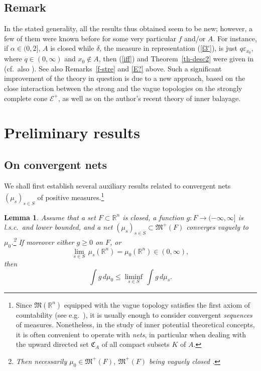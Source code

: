 \documentclass[12pt,a4paper,reqno]{amsart} %
\theoremstyle{lause}
\theoremstyle{maaritelma}
\theoremstyle{lause}
\newtheorem{lemma}[theorem]{Lemma}
\theoremstyle{maaritelma}
\numberwithin{equation}{section}
\begin{document}
\subsection{Remark}\label{sec-remark}
  In the stated generality,
  all the results thus obtained seem to be new; however, a few of them were known before for some very particular $f$ and/or $A$. For instance, if $\alpha\in(0,2]$, $A$ is closed while $\delta$, the measure in representation (\ref{f3'}), is just $q\varepsilon_{x_0}$, where $q\in(0,\infty)$ and $x_0\not\in A$, then (\ref{iff}) and Theorem~\ref{th-desc2}
  were given in \cite[Corollary~2.6]{Dr0} (cf.\ also \cite[Theorem~2.1]{BDO}). See also Remarks~\ref{f-stre} and \ref{E?} above. Such a significant improvement of the theory in question is due to a new approach, based on the close interaction between the strong and the vague topologies on the strongly complete cone $\mathcal E^+$, as well as on the author's recent theory of inner balayage.

\section{Preliminary results}\label{sec-aux}

\subsection{On convergent nets} We shall first establish several auxiliary results related to convergent nets $(\mu_s)_{s\in S}$ of positive measures.\footnote{Since $\mathfrak M(\mathbb R^n)$ equipped with the vague topology satisfies the first axiom of countability (see e.g.\ \cite[Lemma~4.4]{Z-arx}), it is usually enough to consider convergent {\it sequences} of measures. Nonetheless, in the study of inner potential theoretical concepts, it is often convenient to operate with {\it nets}, in particular when dealing with the upward directed set $\mathfrak C_A$ of all compact subsets $K$ of $A$.}

\begin{lemma}\label{lemma-semi}
Assume that a set $F\subset\mathbb R^n$ is closed, a function $g:F\to(-\infty,\infty]$ is l.s.c.\ and lower bounded, and a net
$(\mu_s)_{s\in S}\subset\mathfrak M^+(F)$ converges vaguely to $\mu_0$.\footnote{Then necessarily $\mu_0\in\mathfrak M^+(F)$, $\mathfrak M^+(F)$ being vaguely closed \cite[Section~III.2, Proposition~6]{B2}.} If moreover either $g\geqslant0$ on $F$, or
  \begin{equation}\label{mu}
    \lim_{s\in S}\,\mu_s(\mathbb R^n)=\mu_0(\mathbb R^n)\in(0,\infty),
  \end{equation}
then
\begin{equation}\label{eq-lower}
 \int g\,d\mu_0\leqslant\liminf_{s\in S}\,\int g\,d\mu_s.
\end{equation}
\end{lemma}
\end{document}
